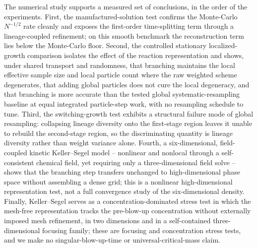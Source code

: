 \documentclass[a4paper,fleqn]{cas-sc}
\theoremstyle{definition}
\theoremstyle{remark}
\begin{document}
The numerical study supports a measured set of conclusions, in the order of the experiments.  First, the
manufactured-solution test confirms the Monte-Carlo $N^{-1/2}$ rate cleanly and exposes the first-order
time-splitting term through a lineage-coupled refinement; on this smooth benchmark the reconstruction term lies
below the Monte-Carlo floor.  Second, the controlled stationary localized-growth comparison isolates the effect of
the reaction representation and shows, under shared transport and randomness, that branching maintains the local
effective sample size and local particle count where the raw weighted scheme degenerates, that adding global
particles does not cure the local degeneracy, and that branching is more accurate than the tested global
systematic-resampling baseline at equal integrated particle-step work, with no resampling schedule to tune.
Third, the switching-growth test exhibits a structural failure mode of global resampling: collapsing lineage
diversity onto the first-stage region leaves it unable to rebuild the second-stage region, so the discriminating
quantity is lineage diversity rather than weight variance alone.  Fourth, a six-dimensional, field-coupled
kinetic Keller--Segel model -- nonlinear and nonlocal through a self-consistent chemical field, yet requiring only
a three-dimensional field solve -- shows that the branching step transfers unchanged to high-dimensional phase
space without assembling a dense grid; this is a nonlinear high-dimensional representation test, not a full
convergence study of the six-dimensional density.  Finally, Keller--Segel serves as a concentration-dominated
stress test in which the mesh-free representation tracks the pre-blow-up concentration without externally imposed
mesh refinement, in two dimensions and in a self-contained three-dimensional focusing family; these are focusing
and concentration stress tests, and we make no singular-blow-up-time or universal-critical-mass claim.
\end{document}
